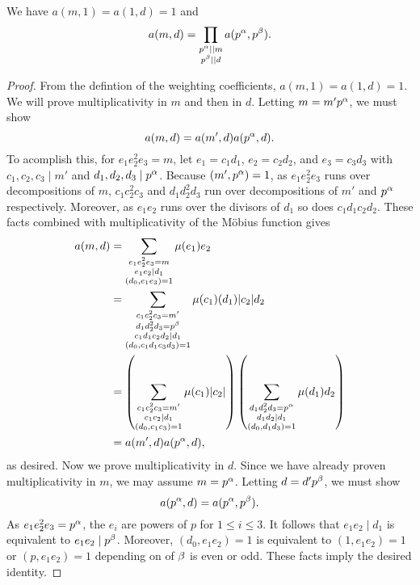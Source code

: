 \documentclass[12pt,reqno,oneside]{amsart}
\begin{document}
    \begin{proposition}\label{prop:multiplicativity_of_weighting_coefficients}
        We have $a(m,1) = a(1,d) = 1$ and
        \[
            a(m,d) = \prod_{\substack{p^{\alpha} \mid\mid m \\ p^{\beta} \mid\mid d}}a(p^{\alpha},p^{\beta}).
        \]
    \end{proposition}
    \begin{proof}
        From the defintion of the weighting coefficients, $a(m,1) = a(1,d) = 1$. We will prove multiplicativity in $m$ and then in $d$. Letting $m = m'p^{\alpha}$, we must show
        \[
            a(m,d) = a(m',d)a(p^{\alpha},d).
        \]
        To acomplish this, for $e_{1}e_{2}^{2}e_{3} = m$, let $e_{1} = c_{1}d_{1}$, $e_{2} = c_{2}d_{2}$, and $e_{3} = c_{3}d_{3}$ with $c_{1},c_{2},c_{3} \mid m'$ and $d_{1},d_{2},d_{3} \mid p^{\alpha}$. Because $(m',p^{\alpha}) = 1$, as $e_{1}e_{2}^{2}e_{3}$ runs over decompositions of $m$, $c_{1}c_{2}^{2}c_{3}$ and $d_{1}d_{2}^{2}d_{3}$ run over decompositions of $m'$ and $p^{\alpha}$ respectively. Moreover, as $e_{1}e_{2}$ runs over the divisors of $d_{1}$ so does $c_{1}d_{1}c_{2}d_{2}$. These facts combined with multiplicativity of the M\"obius function gives
        \begin{align*}
            a(m,d) &= \sum_{\substack{e_{1}e_{2}^{2}e_{3} = m \\ e_{1}e_{2} \mid d_{1} \\ (d_{0},e_{1}e_{3}) = 1}}\mu(e_{1})e_{2} \\
            &= \sum_{\substack{c_{1}c_{2}^{2}c_{3} = m' \\ d_{1}d_{2}^{2}d_{3} = p^{\beta} \\ c_{1}d_{1}c_{2}d_{2} \mid d_{1} \\ (d_{0},c_{1}d_{1}c_{3}d_{3}) = 1}}\mu(c_{1})(d_{1})|c_{2}|d_{2} \\
            &= \left(\sum_{\substack{c_{1}c_{2}^{2}c_{3} = m' \\ c_{1}c_{2} \mid d_{1} \\ (d_{0},c_{1}c_{3}) = 1}}\mu(c_{1})|c_{2}|\right)\left(\sum_{\substack{d_{1}d_{2}^{2}d_{3} = p^{\alpha} \\ d_{1}d_{2} \mid d_{1} \\ (d_{0},d_{1}d_{3}) = 1}}\mu(d_{1})d_{2}\right) \\
            &= a(m',d)a(p^{\alpha},d),
        \end{align*}
        as desired. Now we prove multiplicativity in $d$. Since we have already proven multiplicativity in $m$, we may assume $m = p^{\alpha}$. Letting $d = d'p^{\beta}$, we must show
        \[
            a(p^{\alpha},d) = a(p^{\alpha},p^{\beta}).
        \]
        As $e_{1}e_{2}^{2}e_{3} = p^{\alpha}$, the $e_{i}$ are powers of $p$ for $1 \le i \le 3$. It follows that $e_{1}e_{2} \mid d_{1}$ is equivalent to $e_{1}e_{2} \mid p^{\beta}$. Moreover, $(d_{0},e_{1}e_{2}) = 1$ is equivalent to $(1,e_{1}e_{2}) = 1$ or $(p,e_{1}e_{2}) = 1$ depending on of $\beta$ is even or odd. These facts imply the desired identity.
    \end{proof}
\end{document}

